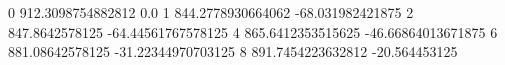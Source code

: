 0 912.3098754882812 0.0
1 844.2778930664062 -68.031982421875
2 847.8642578125 -64.44561767578125
4 865.6412353515625 -46.66864013671875
6 881.08642578125 -31.22344970703125
8 891.7454223632812 -20.564453125
